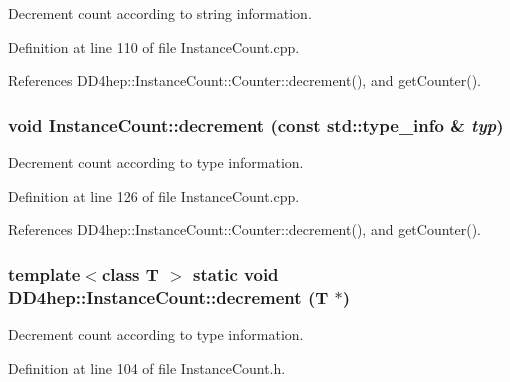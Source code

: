 Decrement count according to string information. 

Definition at line 110 of file InstanceCount.cpp.

References DD4hep::InstanceCount::Counter::decrement(), and getCounter().\hypertarget{struct_d_d4hep_1_1_instance_count_a99ffc259c76fc693c83e8cc493ace1f6}{
\subsubsection[{decrement}]{\setlength{\rightskip}{0pt plus 5cm}void InstanceCount::decrement (const std::type\_\-info \& {\em typ})}}
\label{struct_d_d4hep_1_1_instance_count_a99ffc259c76fc693c83e8cc493ace1f6}


Decrement count according to type information. 

Definition at line 126 of file InstanceCount.cpp.

References DD4hep::InstanceCount::Counter::decrement(), and getCounter().\hypertarget{struct_d_d4hep_1_1_instance_count_a13975237d7100dab59a87dec2f67dc73}{
\subsubsection[{decrement}]{\setlength{\rightskip}{0pt plus 5cm}template$<$class T $>$ static void DD4hep::InstanceCount::decrement ({\bf T} $\ast$)}}
\label{struct_d_d4hep_1_1_instance_count_a13975237d7100dab59a87dec2f67dc73}


Decrement count according to type information. 

Definition at line 104 of file InstanceCount.h.

